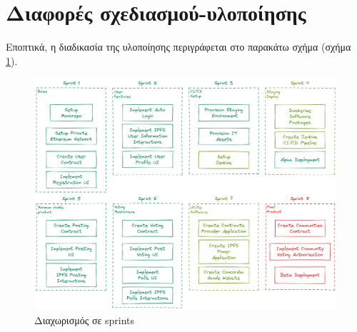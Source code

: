 \section{Διαφορές σχεδιασμού-υλοποίησης} \label{section:4-6-design-implementation-differences}

Εποπτικά, η διαδικασία της υλοποίησης περιγράφεται στο παρακάτω σχήμα (σχήμα \ref{figure:4.6.design-implementation-differences-sprints}).

\begin{figure}[H]
    \centering
    \includegraphics[width=\textwidth]{assets/figures/chapter-4/4.6.design-implementation-differences-sprints.png}
    \caption{Διαχωρισμός σε sprints}
    \label{figure:4.6.design-implementation-differences-sprints}
\end{figure}
